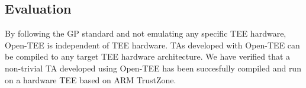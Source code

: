 \documentclass{article}
\begin{document}
\subsection{Evaluation}

By following the GP standard and not emulating any specific TEE hardware, Open-TEE is independent of TEE hardware. TAs developed with Open-TEE can be compiled to any target TEE hardware architecture. We have verified that a non-trivial TA developed using Open-TEE has been succesfully compiled and run on a hardware TEE based on ARM TrustZone.
\end{document}
